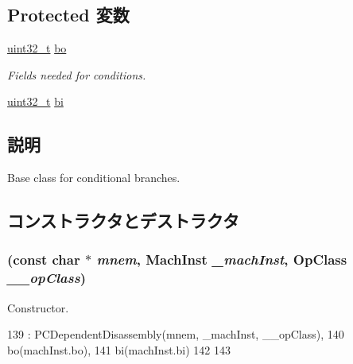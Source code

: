 \subsection*{Protected 変数}
\begin{DoxyCompactItemize}
\item 
\hyperlink{Type_8hh_a435d1572bf3f880d55459d9805097f62}{uint32\_\-t} \hyperlink{classPowerISA_1_1BranchCond_a1d1969bd4c3c3e860a3a647b324ff225}{bo}
\begin{DoxyCompactList}\small\item\em Fields needed for conditions. \item\end{DoxyCompactList}\item 
\hyperlink{Type_8hh_a435d1572bf3f880d55459d9805097f62}{uint32\_\-t} \hyperlink{classPowerISA_1_1BranchCond_a21f21d7a16aa8a182a445666cee1ea99}{bi}
\end{DoxyCompactItemize}


\subsection{説明}
Base class for conditional branches. 

\subsection{コンストラクタとデストラクタ}
\hypertarget{classPowerISA_1_1BranchCond_a0e1bdc738c8fef6a9c070d30f0f91849}{
\subsubsection[{BranchCond}]{ (const char $\ast$ {\em mnem}, \/  {\bf MachInst} {\em \_\-machInst}, \/  OpClass {\em \_\-\_\-opClass})}}
\label{classPowerISA_1_1BranchCond_a0e1bdc738c8fef6a9c070d30f0f91849}


Constructor. 


\begin{DoxyCode}
139         : PCDependentDisassembly(mnem, _machInst, __opClass),
140           bo(machInst.bo),
141           bi(machInst.bi)
142     {
143     }
\end{DoxyCode}



